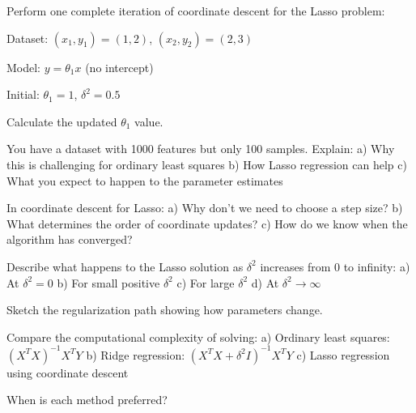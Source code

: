 \documentclass{article}
\newcounter{exercise}
\begin{document}
\begin{tcolorbox}[colback=gray!5!white,colframe=gray!75!black,title=Problem \stepcounter{exercise}: Manual Coordinate Descent]

Perform one complete iteration of coordinate descent for the Lasso problem:

Dataset: $(x_1, y_1) = (1, 2)$, $(x_2, y_2) = (2, 3)$

Model: $y = \theta_1 x$ (no intercept)

Initial: $\theta_1 = 1$, $\delta^2 = 0.5$

Calculate the updated $\theta_1$ value.
\end{tcolorbox}

\begin{tcolorbox}[colback=gray!5!white,colframe=gray!75!black,title=Problem \stepcounter{exercise}: Feature Selection Scenario]

You have a dataset with 1000 features but only 100 samples. Explain:
a) Why this is challenging for ordinary least squares
b) How Lasso regression can help
c) What you expect to happen to the parameter estimates
\end{tcolorbox}

\begin{tcolorbox}[colback=gray!5!white,colframe=gray!75!black,title=Problem \stepcounter{exercise}: Convergence Analysis]

In coordinate descent for Lasso:
a) Why don't we need to choose a step size?
b) What determines the order of coordinate updates?
c) How do we know when the algorithm has converged?
\end{tcolorbox}

\begin{tcolorbox}[colback=gray!5!white,colframe=gray!75!black,title=Problem \stepcounter{exercise}: Regularization Path]

Describe what happens to the Lasso solution as $\delta^2$ increases from 0 to infinity:
a) At $\delta^2 = 0$
b) For small positive $\delta^2$ 
c) For large $\delta^2$
d) At $\delta^2 \to \infty$

Sketch the regularization path showing how parameters change.
\end{tcolorbox}

\begin{tcolorbox}[colback=gray!5!white,colframe=gray!75!black,title=Problem \stepcounter{exercise}: Computational Comparison]

Compare the computational complexity of solving:
a) Ordinary least squares: $(X^T X)^{-1} X^T Y$
b) Ridge regression: $(X^T X + \delta^2 I)^{-1} X^T Y$  
c) Lasso regression using coordinate descent

When is each method preferred?
\end{tcolorbox}
\end{document}
